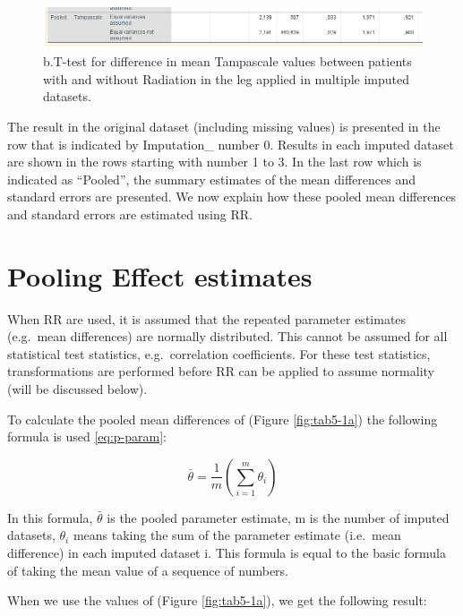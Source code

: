\documentclass[]{book}
\theoremstyle{definition}
\theoremstyle{definition}
\theoremstyle{definition}
\theoremstyle{remark}
\begin{document}
\begin{figure}

{\centering \includegraphics[width=0.9\linewidth]{images/table5.1b} 

}

\caption{b.T-test for difference in mean Tampascale values between patients with and without Radiation in the leg applied in multiple imputed datasets.}\label{fig:tab9-2}
\end{figure}

The result in the original dataset (including missing values) is
presented in the row that is indicated by Imputation\_ number 0. Results
in each imputed dataset are shown in the rows starting with number 1 to
3. In the last row which is indicated as ``Pooled'', the summary
estimates of the mean differences and standard errors are presented. We
now explain how these pooled mean differences and standard errors are
estimated using RR.

\section{Pooling Effect estimates}\label{pooling-effect-estimates}

When RR are used, it is assumed that the repeated parameter estimates
(e.g.~mean differences) are normally distributed. This cannot be assumed
for all statistical test statistics, e.g.~correlation coefficients. For
these test statistics, transformations are performed before RR can be
applied to assume normality (will be discussed below).

To calculate the pooled mean differences of (Figure \ref{fig:tab5-1a})
the following formula is used \eqref{eq:p-param}:

\begin{equation}
  \bar{\theta} = \frac{1}{m}\left (\sum_{i=1}^m{\theta_i}\right )
  \label{eq:p-param}
\end{equation}

In this formula, \(\bar{\theta}\) is the pooled parameter estimate, m is
the number of imputed datasets, \(\theta_i\) means taking the sum of the
parameter estimate (i.e.~mean difference) in each imputed dataset i.
This formula is equal to the basic formula of taking the mean value of a
sequence of numbers.

When we use the values of (Figure \ref{fig:tab5-1a}), we get the
following result:
\end{document}
